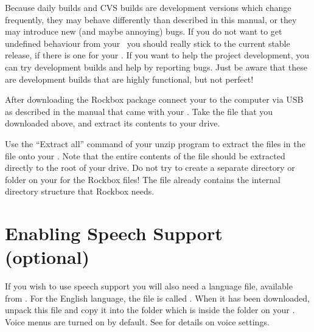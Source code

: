 
Because daily builds and CVS builds are development versions which change 
frequently, they may behave differently than described in this manual, or 
they may introduce new (and maybe annoying) bugs. If you do not want to get 
undefined behaviour from your \dap\ you should really stick to the current 
stable release, if there is one for your \dap{}. If you want to help the 
project development, you can try development builds and help by reporting 
bugs. Just be aware that these are development builds that are  highly 
functional, but not perfect!

After downloading the Rockbox package connect your \dap{} to the computer via 
USB as described in the manual that came with your \dap{}. Take the file that 
you downloaded above, and extract its contents to your \daps{} drive.

Use the ``Extract all'' command of your unzip program to extract the files in 
the  file onto your \dap{}. Note that the entire contents of the 
 file should be extracted directly to the root of your \daps{} 
drive.  Do not try to create a separate directory or folder on your \dap{} for 
the Rockbox files!  The  file already contains the internal 
directory structure that Rockbox needs. 


\section{Enabling Speech Support (optional)}\label{sec:enabling_speech_support}
If you wish to use speech support you will also need a language file, available
from . For the English language, the file is called
. When it has been downloaded, unpack this file and copy 
it into the  folder which is inside the  folder on
your \dap{}. Voice menus are turned on by default. See
 for details on voice settings.

